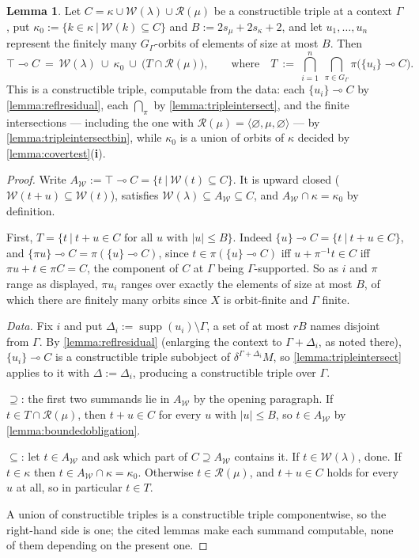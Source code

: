 \documentclass{article}
\theoremstyle{definition}
\newtheorem{lemma}{Lemma}[section]
\newcommand{\cR}{\mathcal{R}}
\newcommand{\cW}{\mathcal{W}}
\newcommand{\supp}{\operatorname{supp}}
\begin{document}
\begin{lemma}
    \label{lemma:zerocompW}
    Let $C=\kappa\cup\cW(\lambda)\cup\cR(\mu)$ be a constructible triple at a context $\Gamma$, put $\kappa_0:=\{k\in\kappa\ |\ \cW(k)\subseteq C\}$ and $B:=2s_\mu+2s_\kappa+2$, and let $u_1,\dots,u_n$ represent the finitely many $G_\Gamma$-orbits of elements of size at most $B$. Then
    $$\top\multimap C\ =\ \cW(\lambda)\ \cup\ \kappa_0\ \cup\ \bigl(T\cap\cR(\mu)\bigr),\qquad\text{where}\quad T\ :=\ \bigcap_{i=1}^n\ \bigcap_{\pi\in G_\Gamma}\pi\bigl(\{u_i\}\multimap C\bigr).$$
    This is a constructible triple, computable from the data: each $\{u_i\}\multimap C$ by \cref{lemma:reflresidual}, each $\bigcap_\pi$ by \cref{lemma:tripleintersect}, and the finite intersections --- including the one with $\cR(\mu)=\langle\varnothing,\mu,\varnothing\rangle$ --- by \cref{lemma:tripleintersectbin}, while $\kappa_0$ is a union of orbits of $\kappa$ decided by \cref{lemma:covertest}({\bf i}).
\end{lemma}
\begin{proof}
    Write $A_\cW:=\top\multimap C=\{t\ |\ \cW(t)\subseteq C\}$. It is upward closed ($\cW(t+u)\subseteq\cW(t)$), satisfies $\cW(\lambda)\subseteq A_\cW\subseteq C$, and $A_\cW\cap\kappa=\kappa_0$ by definition.

    First, $T=\{t\ |\ t+u\in C\text{ for all }u\text{ with }|u|\leq B\}$. Indeed $\{u\}\multimap C=\{t\ |\ t+u\in C\}$, and $\{\pi u\}\multimap C=\pi(\{u\}\multimap C)$, since $t\in\pi(\{u\}\multimap C)$ iff $u+\pi^{-1}t\in C$ iff $\pi u+t\in\pi C=C$, the component of $C$ at $\Gamma$ being $\Gamma$-supported. So as $i$ and $\pi$ range as displayed, $\pi u_i$ ranges over exactly the elements of size at most $B$, of which there are finitely many orbits since $X$ is orbit-finite and $\Gamma$ finite.

    {\it Data.} Fix $i$ and put $\Delta_i:=\supp(u_i)\setminus\Gamma$, a set of at most $rB$ names disjoint from $\Gamma$. By \cref{lemma:reflresidual} (enlarging the context to $\Gamma+\Delta_i$, as noted there), $\{u_i\}\multimap C$ is a constructible triple subobject of $\delta^{\Gamma+\Delta_i}M$, so \cref{lemma:tripleintersect} applies to it with $\Delta:=\Delta_i$, producing a constructible triple over $\Gamma$.

    $\supseteq$: the first two summands lie in $A_\cW$ by the opening paragraph. If $t\in T\cap\cR(\mu)$, then $t+u\in C$ for every $u$ with $|u|\leq B$, so $t\in A_\cW$ by \cref{lemma:boundedobligation}.

    $\subseteq$: let $t\in A_\cW$ and ask which part of $C\supseteq A_\cW$ contains it. If $t\in\cW(\lambda)$, done. If $t\in\kappa$ then $t\in A_\cW\cap\kappa=\kappa_0$. Otherwise $t\in\cR(\mu)$, and $t+u\in C$ holds for every $u$ at all, so in particular $t\in T$.

    A union of constructible triples is a constructible triple componentwise, so the right-hand side is one; the cited lemmas make each summand computable, none of them depending on the present one.
\end{proof}
\end{document}
